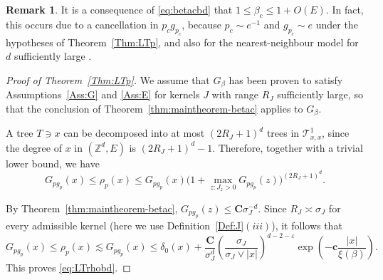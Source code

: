 \documentclass[11pt,a4paper]{article}
\numberwithin{equation}{section}
\theoremstyle{plain}
\theoremstyle{definition}
\newtheorem{Rem}[Thm]{Remark}
\newcommand\1{\mathds{1}}
\newcommand\bfc{\mathbf{c}}
\newcommand\bfC{\mathbf{C}}
\begin{document}
\begin{Rem}
It is a consequence of \eqref{eq:betacbd} that $1 \le \beta_c \le 1+O(E)$.
In fact, this occurs due to a cancellation in $p_cg_{p_c}$,
because $p_c\sim e^{-1}$ and $g_{p_c}\sim e$ under the hypotheses
of Theorem~\ref{Thm:LTp}, and also for the nearest-neighbour model for $d$ sufficiently large \cite{MS13,KS24,Penr94}.
\end{Rem}

\begin{proof}[Proof of Theorem~\textup{\ref{Thm:LTp}}]
We assume that $G_\beta$ has been proven to satisfy Assumptions~\ref{Ass:G} and \ref{Ass:E}
for kernels $J$ with range $R_J$ sufficiently large, so
that the conclusion of Theorem~\ref{thm:maintheorem-betac} applies to $G_\beta$.

A tree $T \ni x$ can be decomposed into at most $(2R_J+1)^d$ trees in $\mathcal{T}^1_{x,x}$,
since the degree of $x$ in $(\mathbb Z^d,E)$ is $(2R_J+1)^d-1$.  Therefore,
together with a trivial lower bound,
we have
\begin{equation}\label{eq:comp rho G}
    G_{p g_p}(x) \le \rho_p(x) \leq G_{p g_p}(x)
    \Big( 1+ \max_{z:J_z>0}G_{pg_p}(z) \Big)^{(2R_J+1)^d}
    .
\end{equation}

By Theorem~\ref{thm:maintheorem-betac},
$G_{p g_p}(z) \leq  \bfC \sigma_J^{-d}$.
Since $R_J \asymp \sigma_J$ for every admissible kernel (here we use Definition~\ref{Def:J}$(iii)$), it follows that
\begin{equation}
    G_{p g_p}(x) \le \rho_p(x) \lesssim  G_{p g_p}(x) \le
     \delta_0(x)
    + \frac{\bfC}{\sigma_J^d}
    \left(\frac{\sigma_J}{\sigma_J \vee|x|} \right)^{d-2-\varepsilon}
    \exp\left(-\bfc\frac{|x|}{\xi(\beta)}\right).
\end{equation}
This proves \eqref{eq:LTrhobd}.


\end{proof}
\end{document}
